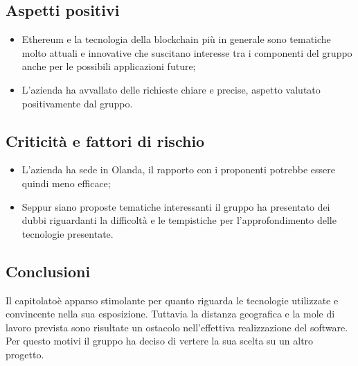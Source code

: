 \subsection{Aspetti positivi}
\begin{itemize}
    \item Ethereum e la tecnologia della blockchain più in generale sono tematiche molto attuali e innovative che suscitano interesse tra i componenti del gruppo
    anche per le possibili applicazioni future;
    \item L'azienda ha avvallato delle richieste chiare e precise, aspetto valutato positivamente dal gruppo.
\end{itemize}
\subsection{Criticità e fattori di rischio}
\begin{itemize}
    \item L'azienda ha sede in Olanda, il rapporto con i proponenti potrebbe essere quindi meno efficace;
    \item Seppur siano proposte tematiche interessanti il gruppo ha presentato dei dubbi riguardanti la difficoltà e le tempistiche per l'approfondimento
    delle tecnologie presentate.
\end{itemize}
\subsection{Conclusioni}
Il capitolato\glosp è apparso stimolante per quanto riguarda le tecnologie utilizzate e convincente nella sua esposizione. Tuttavia la distanza geografica e la
mole di lavoro prevista sono risultate un ostacolo nell'effettiva realizzazione del software. Per questo motivi il gruppo ha deciso di vertere la sua scelta
su un altro progetto\glo.
